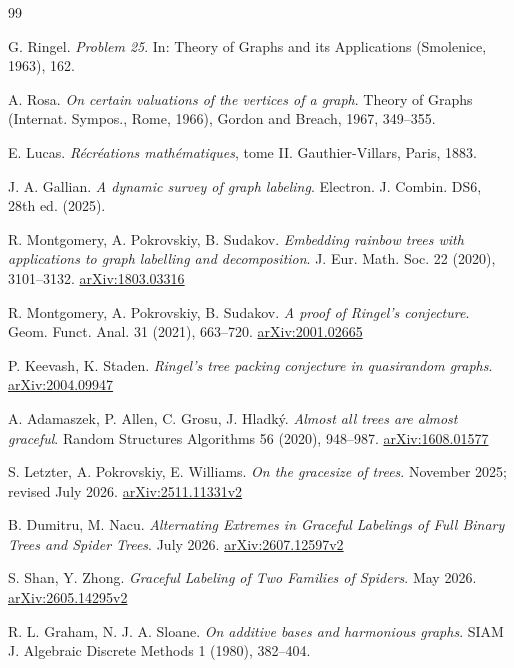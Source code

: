 \begin{thebibliography}{99}

 G. Ringel. \emph{Problem 25}. In: Theory of Graphs and its Applications (Smolenice, 1963), 162.

 A. Rosa. \emph{On certain valuations of the vertices of a graph}. Theory of Graphs (Internat. Sympos., Rome, 1966), Gordon and Breach, 1967, 349--355.

 E. Lucas. \emph{R\'ecr\'eations math\'ematiques}, tome II. Gauthier-Villars, Paris, 1883.

 J. A. Gallian. \emph{A dynamic survey of graph labeling}. Electron. J. Combin. DS6, 28th ed. (2025).

 R. Montgomery, A. Pokrovskiy, B. Sudakov. \emph{Embedding rainbow trees with applications to graph labelling and decomposition}. J. Eur. Math. Soc. 22 (2020), 3101--3132. \href{https://arxiv.org/abs/1803.03316}{arXiv:1803.03316}

 R. Montgomery, A. Pokrovskiy, B. Sudakov. \emph{A proof of Ringel's conjecture}. Geom. Funct. Anal. 31 (2021), 663--720. \href{https://arxiv.org/abs/2001.02665}{arXiv:2001.02665}

 P. Keevash, K. Staden. \emph{Ringel's tree packing conjecture in quasirandom graphs}. \href{https://arxiv.org/abs/2004.09947}{arXiv:2004.09947}

 A. Adamaszek, P. Allen, C. Grosu, J. Hladk\'y. \emph{Almost all trees are almost graceful}. Random Structures Algorithms 56 (2020), 948--987. \href{https://arxiv.org/abs/1608.01577}{arXiv:1608.01577}

 S. Letzter, A. Pokrovskiy, E. Williams. \emph{On the gracesize of trees}. November 2025; revised July 2026. \href{https://arxiv.org/abs/2511.11331v2}{arXiv:2511.11331v2}

 B. Dumitru, M. Nacu. \emph{Alternating Extremes in Graceful Labelings of Full Binary Trees and Spider Trees}. July 2026. \href{https://arxiv.org/abs/2607.12597v2}{arXiv:2607.12597v2}

 S. Shan, Y. Zhong. \emph{Graceful Labeling of Two Families of Spiders}. May 2026. \href{https://arxiv.org/abs/2605.14295v2}{arXiv:2605.14295v2}

 R. L. Graham, N. J. A. Sloane. \emph{On additive bases and harmonious graphs}. SIAM J. Algebraic Discrete Methods 1 (1980), 382--404.


\end{thebibliography}

